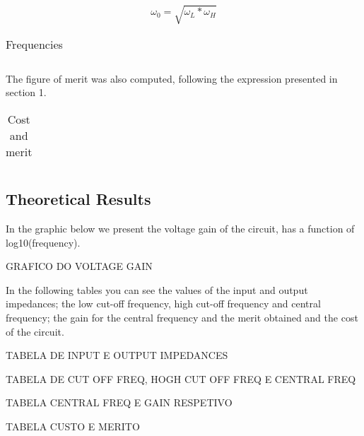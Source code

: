 \begin{equation}
\omega_{0}= \sqrt{\omega_{L} * \omega_{H}}
\end{equation}

\begin{table}[H]
\centering
\begin{tabularx}{0.6\textwidth} {
  | >{\raggedright\arraybackslash}X
  | >{\raggedleft\arraybackslash}X | }
 \hline

\end{tabularx}
\caption{Frequencies}
\end{table}

The figure of merit was also computed, following the expression presented in section 1.

\begin{table}[H]
\centering
\begin{tabularx}{0.6\textwidth} {
  | >{\raggedright\arraybackslash}X
  | >{\raggedleft\arraybackslash}X | }
 \hline

\end{tabularx}
\caption{Cost and merit}
\end{table}


\subsection{Theoretical Results}
In the graphic below we present the voltage gain of the circuit, has a function of log10(frequency).
\par

GRAFICO DO VOLTAGE GAIN

\par
In the following tables you can see the values of the input and output impedances; the low cut-off frequency, high cut-off frequency and central frequency; the gain for the central frequency and the merit obtained and the cost of the circuit.

\par
TABELA DE INPUT E OUTPUT IMPEDANCES

\par
TABELA DE CUT OFF FREQ, HOGH CUT OFF FREQ E CENTRAL FREQ

\par
TABELA CENTRAL FREQ E GAIN RESPETIVO

\par
TABELA CUSTO E MERITO


